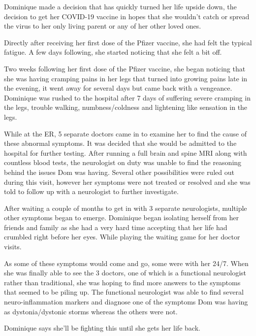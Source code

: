 Dominique made a decision that has quickly turned her life upside down, the
decision to get her COVID-19 vaccine in hopes that she wouldn’t catch or spread
the virus to her only living parent or any of her other loved ones.

Directly after receiving her first dose of the Pfizer vaccine, she had felt the
typical fatigue. A few days following, she started noticing that she felt a bit
off.

Two weeks following her first dose of the Pfizer vaccine, she began noticing
that she was having cramping pains in her legs that turned into growing pains
late in the evening, it went away for several days but came back with a
vengeance. Dominique was rushed to the hospital after 7 days of suffering severe
cramping in the legs, trouble walking, numbness/coldness and lightening like
sensation in the legs.

While at the ER, 5 separate doctors came in to examine her to find the cause of
these abnormal symptoms. It was decided that she would be admitted to the
hospital for further testing. After running a full brain and spine MRI along
with countless blood tests, the neurologist on duty was unable to find the
reasoning behind the issues Dom was having. Several other possibilities were
ruled out during this visit, however her symptoms were not treated or resolved
and she was told to follow up with a neurologist to further investigate.

After waiting a couple of months to get in with 3 separate neurologists,
multiple other symptoms began to emerge. Dominique began isolating herself from
her friends and family as she had a very hard time accepting that her life had
crumbled right before her eyes. While playing the waiting game for her doctor
visits.

As some of these symptoms would come and go, some were with her 24/7. When she
was finally able to see the 3 doctors, one of which is a functional neurologist
rather than traditional, she was hoping to find more answers to the symptoms
that seemed to be piling up. The functional neurologist was able to find several
neuro-inflammation markers and diagnose one of the symptoms Dom was having as
dystonia/dystonic storms whereas the others were not.

Dominique says she’ll be fighting this until she gets her life back.

